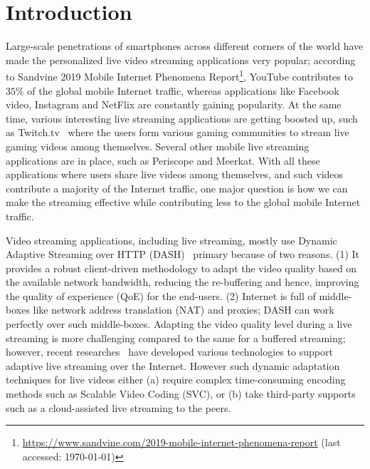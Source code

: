 \section{Introduction}
Large-scale penetrations of smartphones across different corners of the world have made the personalized live video streaming applications very popular; according to Sandvine 2019 Mobile Internet Phenomena Report\footnote{\url{https://www.sandvine.com/2019-mobile-internet-phenomena-report} (last accessed: \today)}, YouTube contributes to $35\%$ of the global mobile Internet traffic, whereas applications like Facebook video, Instagram and NetFlix are constantly gaining popularity.  At the same time, various interesting live streaming applications are getting boosted up, such as Twitch.tv~\cite{pires2015youtube} where the users form various gaming communities to stream live gaming videos among themselves. Several other mobile live streaming applications are in place, such as Periscope and Meerkat. With all these applications where users share live videos among themselves, and such videos contribute a majority of the Internet traffic, one major question is how we can make the streaming effective while contributing less to the global mobile Internet traffic. 

Video streaming applications, including live streaming, mostly use Dynamic Adaptive Streaming over HTTP (DASH)~\cite{stockhammer2011dynamic} primary because of two reasons. (1) It provides a robust client-driven methodology to adapt the video quality based on the available network bandwidth, reducing the re-buffering and hence, improving the quality of experience (QoE) for the end-users. (2) Internet is full of middle-boxes like network address translation (NAT) and proxies; DASH can work perfectly over such middle-boxes. Adapting the video quality level during a live streaming is more challenging compared to the same for a buffered streaming; however, recent researches~\cite{TNET-Migration-2016,huysegems2015http,roverso2015smoothcache,merani2016adaptive} have developed various technologies to support adaptive live streaming over the Internet. However such dynamic adaptation techniques for live videos either (a) require complex time-consuming encoding methods such as Scalable Video Coding (SVC), or (b) take third-party supports such as a cloud-assisted live streaming to the peers. 

